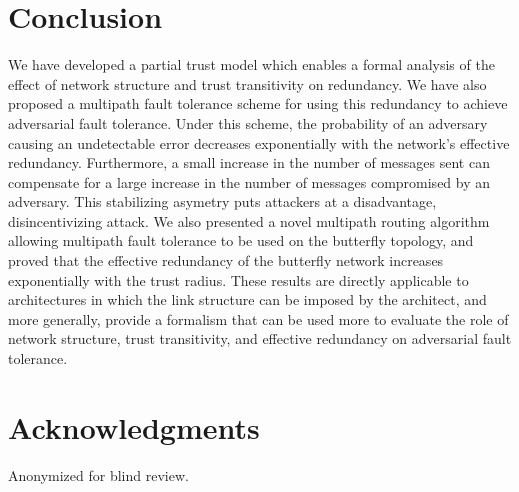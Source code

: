 \documentclass{sig-alternate-05-2015}
\begin{document}
\section{Conclusion}

We have developed a partial trust model which enables a formal analysis
of the effect of network structure and trust transitivity on
redundancy.
We have also proposed a multipath fault tolerance scheme
for using this redundancy to achieve adversarial
fault tolerance.
Under this scheme, the probability of an adversary causing an undetectable error
decreases exponentially with the network's effective redundancy.
Furthermore, a small increase in the number of messages sent can compensate
for a large increase in the number of messages compromised by an adversary.
This stabilizing asymetry puts attackers at a disadvantage,
disincentivizing attack.
We also presented a novel multipath routing algorithm allowing multipath fault
tolerance to be used on the butterfly topology,
and proved that the effective redundancy of the butterfly network increases
exponentially with the trust radius.
These results are directly applicable to architectures in which the link
structure can be imposed by the architect,
and more generally, provide a formalism that can be used more to evaluate
the role of network structure, trust transitivity, and effective redundancy
on adversarial fault tolerance.

\section{Acknowledgments}
Anonymized for blind review.

%

%
%
%
\end{document}
